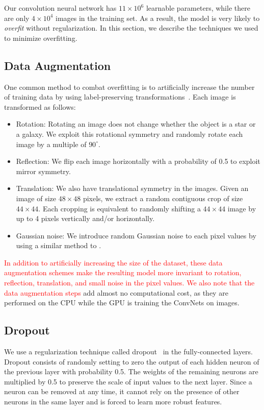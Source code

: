 \documentclass[fleqn,usenatbib]{mnras}
\newcommand{\changed}[1]{\textcolor{red}{#1}}
\begin{document}
Our convolution neural network has $11\times10^6$ learnable parameters,
while there are only $4\times10^4$ images in the training set.
As a result, the model is very likely to \emph{overfit} without regularization.
In this section, we describe the techniques we used to minimize overfitting.

\subsection{Data Augmentation}
  \label{sec:data_augmentation}
  
One common method to combat overfitting is to artificially increase
the number of training data by using label-preserving
transformations~\citep{krizhevsky2012imagenet,dieleman2015rotation,dieleman2016exploiting}.
Each image is transformed as follows:
\begin{itemize}
\item{Rotation: 
Rotating an image does not change whether the object is a star or a galaxy.
We exploit this rotational symmetry and randomly rotate each image by a multiple of
$90^{\circ}$. }

\item{Reflection:
We flip each image horizontally with a probability of 0.5 to exploit mirror symmetry. }
\item{Translation:
We also have translational symmetry in the images.
Given an image of size $48\times48$ pixels, we extract a random contiguous crop
of size $44\times44$.
Each cropping is equivalent to randomly shifting a $44\times44$ image by up to 4 pixels
vertically and/or horizontally. }
\item{Gaussian noise:
We introduce random Gaussian noise to each pixel values
by using a similar method to \cite{krizhevsky2012imagenet}.}
\end{itemize}
\changed{
In addition to artificially increasing the size of the dataset,
these data augmentation schemes make the resulting model more invariant to
rotation, reflection, translation, and small noise in the pixel values.
We also note that the data augmentation steps
}
add almost no computational cost,
as they are performed on the CPU while the GPU is training the ConvNets on images.

\subsection{Dropout}

We use a regularization technique called dropout~\citep{hinton2012improving}
in the fully-connected layers.
Dropout consists of randomly setting to zero
the output of each hidden neuron of the previous layer with probability 0.5.
The weights of the remaining neurons are multiplied by 0.5 to preserve
the scale of input values to the next layer.
Since a neuron can be removed at any time, it cannot rely on the presence of other neurons
in the same layer and is forced to learn more robust features.
\end{document}
